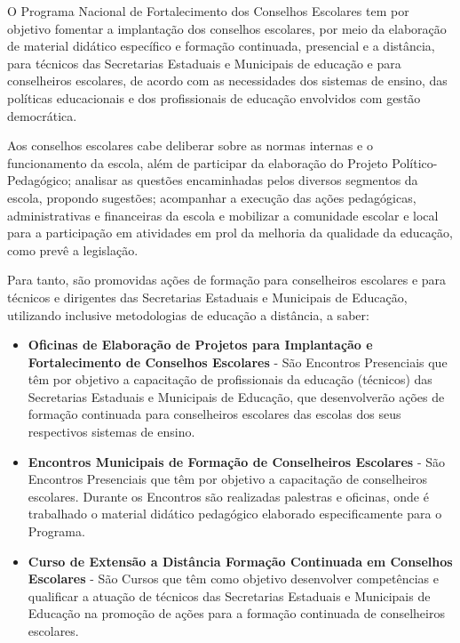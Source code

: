 \documentclass[
	12pt,				%
	openright,			%
	oneside,
	a4paper,			%
	chapter=TITLE,		%
	section=TITLE,		%
	sumario=abnt-6027-2012,
	english,			%
	brazil				%
]{abntex2}
\begin{document}
		\begin{citacao}
			O Programa Nacional de Fortalecimento dos Conselhos Escolares tem por objetivo fomentar a implantação dos conselhos escolares, por meio da elaboração de material didático específico e formação continuada, presencial e a distância, para técnicos das Secretarias Estaduais e Municipais de educação e para conselheiros escolares, de acordo com as necessidades dos sistemas de ensino, das políticas educacionais e dos profissionais de educação envolvidos com gestão democrática.
			
			Aos conselhos escolares cabe deliberar sobre as normas internas e o funcionamento da escola, além de participar da elaboração do Projeto Político-Pedagógico; analisar as questões encaminhadas pelos diversos segmentos da escola, propondo sugestões; acompanhar a execução das ações pedagógicas, administrativas e financeiras da escola e mobilizar a comunidade escolar e local para a participação em atividades em prol da melhoria da qualidade da educação, como prevê a legislação.
			
			Para tanto, são promovidas ações de formação para conselheiros escolares e para técnicos e dirigentes das Secretarias Estaduais e Municipais de Educação, utilizando inclusive metodologias de educação a distância, a saber:
				
			\begin{itemize}[leftmargin=15.5mm]
				
				\item \textbf{Oficinas de Elaboração de Projetos para Implantação e Fortalecimento de Conselhos Escolares}
				- São Encontros Presenciais que têm por objetivo a capacitação de profissionais da educação (técnicos) das Secretarias Estaduais e Municipais de Educação, que desenvolverão ações de formação continuada para conselheiros escolares das escolas dos seus respectivos sistemas de ensino.
				
				\item \textbf{Encontros Municipais de Formação de Conselheiros Escolares} - São Encontros Presenciais que têm por objetivo a capacitação de conselheiros escolares. Durante os Encontros são realizadas palestras e oficinas, onde é trabalhado o material didático pedagógico elaborado especificamente para o Programa.
				
				\item \textbf{Curso de Extensão a Distância Formação Continuada em Conselhos Escolares} - São Cursos que têm como objetivo desenvolver competências e qualificar a atuação de técnicos das Secretarias Estaduais e Municipais de Educação na promoção de ações para a formação continuada de conselheiros escolares.
				

\end{itemize}
\end{citacao}
\end{document}
